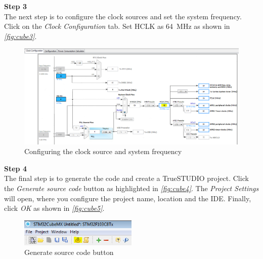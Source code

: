 \documentclass[a4paper,12pt,oneside]{book}
\begin{document}
\clearpage

\textbf{Step 3}
\medskip
\\
The next step is to configure the clock sources and set the system frequency. Click on the \textit{Clock Configuration} tab. Set HCLK as \SI{64}{\mega\hertz} as shown in \textit{\autoref{fig:cube3}}.\\

\begin{figure}[!htb]
\centering
\includegraphics[width=1.2\textwidth, angle=90]{images/cubemx_3}
\caption{Configuring the clock source and system frequency}
\label{fig:cube3}
\end{figure}

\textbf{Step 4}
\medskip
\\
The final step is to generate the code and create a TrueSTUDIO project. Click the \textit{Generate source code} button as highlighted in \textit{\autoref{fig:cube4}}. The \textit{Project Settings} will open, where you configure the project name, location and the IDE. Finally, click \textit{OK} as shown in \textit{\autoref{fig:cube5}}.\\

\begin{figure}[!htb]
\centering
\includegraphics[width=0.5\textwidth]{images/cubemx_4}
\caption{Generate source code button}
\label{fig:cube4}
\end{figure}

\medskip
\end{document}
